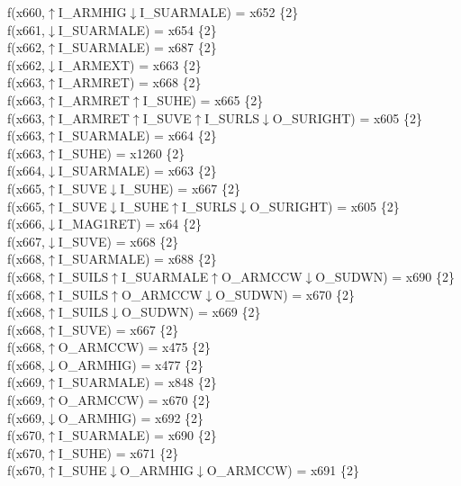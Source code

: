 f(x660,$\uparrow$I\_ARMHIG$\downarrow$I\_SUARMALE) = x652 \{2\} \\  
f(x661,$\downarrow$I\_SUARMALE) = x654 \{2\} \\  
f(x662,$\uparrow$I\_SUARMALE) = x687 \{2\} \\  
f(x662,$\downarrow$I\_ARMEXT) = x663 \{2\} \\  
f(x663,$\uparrow$I\_ARMRET) = x668 \{2\} \\  
f(x663,$\uparrow$I\_ARMRET$\uparrow$I\_SUHE) = x665 \{2\} \\  
f(x663,$\uparrow$I\_ARMRET$\uparrow$I\_SUVE$\uparrow$I\_SURLS$\downarrow$O\_SURIGHT) = x605 \{2\} \\  
f(x663,$\uparrow$I\_SUARMALE) = x664 \{2\} \\  
f(x663,$\uparrow$I\_SUHE) = x1260 \{2\} \\  
f(x664,$\downarrow$I\_SUARMALE) = x663 \{2\} \\  
f(x665,$\uparrow$I\_SUVE$\downarrow$I\_SUHE) = x667 \{2\} \\  
f(x665,$\uparrow$I\_SUVE$\downarrow$I\_SUHE$\uparrow$I\_SURLS$\downarrow$O\_SURIGHT) = x605 \{2\} \\  
f(x666,$\downarrow$I\_MAG1RET) = x64 \{2\} \\  
f(x667,$\downarrow$I\_SUVE) = x668 \{2\} \\  
f(x668,$\uparrow$I\_SUARMALE) = x688 \{2\} \\  
f(x668,$\uparrow$I\_SUILS$\uparrow$I\_SUARMALE$\uparrow$O\_ARMCCW$\downarrow$O\_SUDWN) = x690 \{2\} \\  
f(x668,$\uparrow$I\_SUILS$\uparrow$O\_ARMCCW$\downarrow$O\_SUDWN) = x670 \{2\} \\  
f(x668,$\uparrow$I\_SUILS$\downarrow$O\_SUDWN) = x669 \{2\} \\  
f(x668,$\uparrow$I\_SUVE) = x667 \{2\} \\  
f(x668,$\uparrow$O\_ARMCCW) = x475 \{2\} \\  
f(x668,$\downarrow$O\_ARMHIG) = x477 \{2\} \\  
f(x669,$\uparrow$I\_SUARMALE) = x848 \{2\} \\  
f(x669,$\uparrow$O\_ARMCCW) = x670 \{2\} \\  
f(x669,$\downarrow$O\_ARMHIG) = x692 \{2\} \\  
f(x670,$\uparrow$I\_SUARMALE) = x690 \{2\} \\  
f(x670,$\uparrow$I\_SUHE) = x671 \{2\} \\  
f(x670,$\uparrow$I\_SUHE$\downarrow$O\_ARMHIG$\downarrow$O\_ARMCCW) = x691 \{2\} \\  
